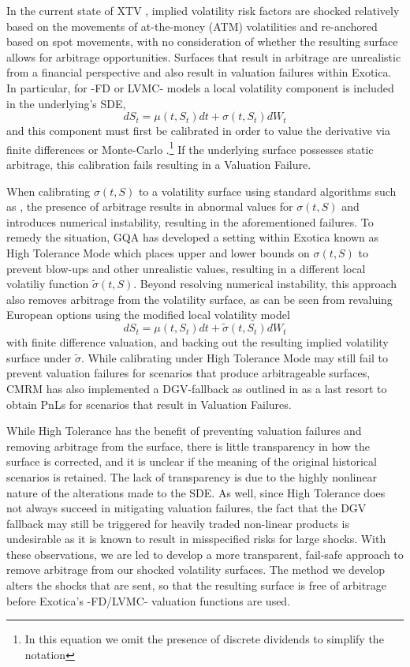 \documentclass[11pt,letterpaper]{article}
\begin{document}
In the current state of XTV \cite{xtv}, implied volatility risk factors are shocked relatively based on the movements of at-the-money (ATM) volatilities and re-anchored based on spot movements, with no consideration of whether the resulting surface allows for arbitrage opportunities. Surfaces that result in arbitrage are unrealistic from a financial perspective and also result in valuation failures within Exotica. In particular, for -FD or LVMC- models a local volatility component is included in the underlying's SDE,
\[
dS_t = \mu(t,S_t) dt + \sigma(t,S_t) dW_t 
\]
and this component must first be calibrated in order to value the derivative via finite differences or Monte-Carlo \cite{gqa_localvol}.\footnote{In this equation we omit the presence of discrete dividends to simplify the notation} If the underlying surface possesses static arbitrage, this calibration fails resulting in a Valuation Failure. 

When calibrating $\sigma(t,S)$ to a volatility surface using standard algorithms such as \cite{dupire1994pricing}, the presence of arbitrage results in abnormal values for $\sigma(t,S)$ and introduces numerical instability, resulting in the aforementioned failures. To remedy the situation, GQA has developed a setting within Exotica known as High Tolerance Mode \cite{gqa_localvol} which places upper and lower bounds on $\sigma(t,S)$ to prevent blow-ups and other unrealistic values, resulting in a different local volatiliy function $\widetilde{\sigma}(t,S)$. Beyond resolving numerical instability, this approach also removes arbitrage from the volatility surface, as can be seen from revaluing European options using the modified local volatility model
\[
dS_t = \mu(t,S_t) dt + \widetilde{\sigma}(t,S_t) dW_t
\]
with finite difference valuation, and backing out the resulting implied volatility surface under $\widetilde{\sigma}$. While calibrating under High Tolerance Mode may still fail to prevent valuation failures for scenarios that produce arbitrageable surfaces, CMRM has also implemented a DGV-fallback as outlined in \cite{xtv} as a last resort to obtain PnLs for scenarios that result in Valuation Failures.  

While High Tolerance has the benefit of preventing valuation failures and removing arbitrage from the surface, there is little transparency in how the surface is corrected, and it is unclear if the meaning of the original historical scenarios is retained. The lack of transparency is due to the highly nonlinear nature of the alterations made to the SDE. As well, since High Tolerance does not always succeed in mitigating valuation failures, the fact that the DGV fallback may still be triggered for heavily traded non-linear products is undesirable as it is known to result in misspecified risks for large shocks. With these observations, we are led to develop a more transparent, fail-safe approach to remove arbitrage from our shocked volatility surfaces. The method we develop alters the shocks that are sent, so that the resulting surface is free of arbitrage before Exotica's -FD/LVMC- valuation functions are used. 
\end{document}
